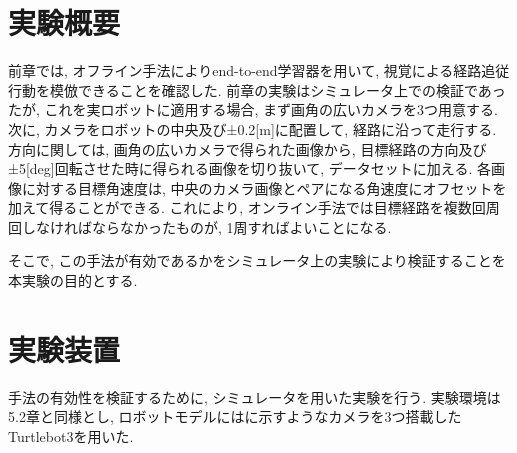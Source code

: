 
\section{実験概要}
前章では, オフライン手法によりend-to-end学習器を用いて, 視覚による経路追従行動を模倣できることを確認した. 前章の実験はシミュレータ上での検証であったが, これを実ロボットに適用する場合, まず画角の広いカメラを3つ用意する. 次に, カメラをロボットの中央及び±0.2[m]に配置して, 経路に沿って走行する. 方向に関しては, 画角の広いカメラで得られた画像から, 目標経路の方向及び±5[deg]回転させた時に得られる画像を切り抜いて, データセットに加える. 各画像に対する目標角速度は, 中央のカメラ画像とペアになる角速度にオフセットを加えて得ることができる. これにより, オンライン手法では目標経路を複数回周回しなければならなかったものが, 1周すればよいことになる. 
\par そこで, この手法が有効であるかをシミュレータ上の実験により検証することを本実験の目的とする. 



\section{実験装置}
手法の有効性を検証するために, シミュレータを用いた実験を行う. 実験環境は5.2章と同様とし, ロボットモデルにはに示すようなカメラを3つ搭載したTurtlebot3\cite{turtlebot3}を用いた.


